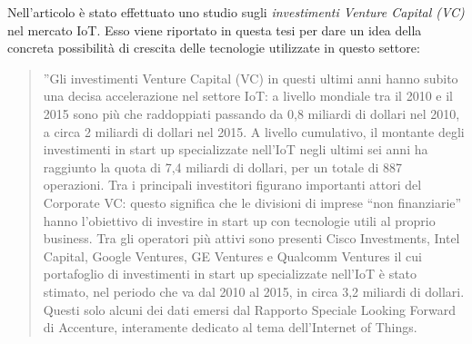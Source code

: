 \documentclass[a4paper]{report} %
\begin{document}
Nell'articolo \cite{art:rif.22} è stato effettuato uno studio sugli \textit{investimenti Venture Capital (VC)} nel mercato IoT. Esso viene riportato in questa tesi per dare un idea della concreta possibilità di crescita delle tecnologie utilizzate in questo settore:
\begin{quote}
	''Gli investimenti Venture Capital (VC) in questi ultimi anni hanno subito una decisa accelerazione nel settore IoT: a livello mondiale tra il 2010 e il 2015 sono più che raddoppiati passando da 0,8 miliardi di dollari nel 2010, a circa 2 miliardi di dollari nel 2015. A livello cumulativo, il montante degli investimenti in start up specializzate nell’IoT negli ultimi sei anni ha raggiunto la quota di 7,4 miliardi di dollari, per un totale di 887 operazioni. Tra i principali investitori figurano importanti attori del Corporate VC: questo significa che le divisioni di imprese “non finanziarie” hanno l’obiettivo di investire in start up con tecnologie utili al proprio business. Tra gli operatori più attivi sono presenti Cisco Investments, Intel Capital, Google Ventures, GE Ventures e Qualcomm Ventures il cui portafoglio di investimenti in start up specializzate nell’IoT è stato stimato, nel periodo che va dal 2010 al 2015, in circa 3,2 miliardi di dollari. Questi solo alcuni dei dati emersi dal Rapporto Speciale Looking Forward di Accenture, interamente dedicato al tema dell’Internet of Things.

\end{quote}
\end{document}
